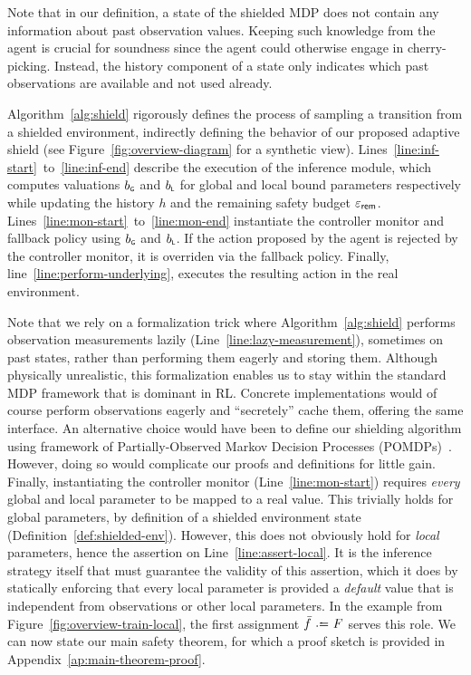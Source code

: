 \documentclass[acmsmall,screen,nonacm]{acmart}
\begin{document}
Note that in our definition, a state of the shielded MDP does not contain any information about past observation values. Keeping such knowledge from the agent is crucial for soundness since the agent could otherwise engage in cherry-picking. Instead, the history component of a state only indicates which past observations are available and not used already.

Algorithm~\ref{alg:shield} rigorously defines the process of sampling a transition from a shielded environment, indirectly defining the behavior of our proposed adaptive shield (see Figure~\ref{fig:overview-diagram} for a synthetic view). Lines~\ref{line:inf-start}~to~\ref{line:inf-end} describe the execution of the inference module, which computes valuations $b_\textsf{\tiny G}$ and $b_\textsf{\tiny L}$ for global and local bound parameters respectively while updating the history $h$ and the remaining safety budget $\varepsilon_{\mathsf{rem}}$. Lines~\ref{line:mon-start}~to~\ref{line:mon-end} instantiate the controller monitor and fallback policy using $b_\textsf{\tiny G}$ and $b_\textsf{\tiny L}$. If the action proposed by the agent is rejected by the controller monitor, it is overriden via the fallback policy. Finally, line~\ref{line:perform-underlying}, executes the resulting action in the real environment.

Note that we rely on a formalization trick where Algorithm~\ref{alg:shield} performs observation measurements lazily (Line~\ref{line:lazy-measurement}), sometimes on past states, rather than performing them eagerly and storing them. Although physically unrealistic, this formalization enables us to stay within the standard MDP framework that is dominant in RL. Concrete implementations would of course perform observations eagerly and ``secretely'' cache them, offering the same interface. An alternative choice would have been to define our shielding algorithm using framework of Partially-Observed Markov Decision Processes (POMDPs)~\cite{kochenderfer2015decision}. However, doing so would complicate our proofs and definitions for little gain. Finally, instantiating the controller monitor (Line~\ref{line:mon-start}) requires \emph{every} global and local parameter to be mapped to a real value. This trivially holds for global parameters, by definition of a shielded environment state (Definition~\ref{def:shielded-env}). However, this does not obviously hold for \emph{local} parameters, hence the assertion on Line~\ref{line:assert-local}. It is the inference strategy itself that must guarantee the validity of this assertion, which it does by statically enforcing that every local parameter is provided a \emph{default} value that is independent from observations or other local parameters. In the example from Figure~\ref{fig:overview-train-local}, the first assignment $\TrainFxMax \slassign F$ serves this role. We can now state our main safety theorem, for which a proof sketch is provided in Appendix~\ref{ap:main-theorem-proof}.
\end{document}
